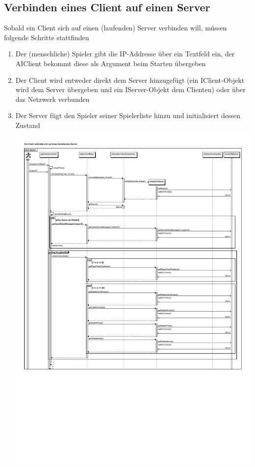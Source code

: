 \documentclass[a4paper,10pt]{article}
\begin{document}
\subsection{Verbinden eines Client auf einen Server}
Sobald ein Client sich auf einen (laufenden) Server verbinden will, müssen folgende Schritte stattfinden
\begin{enumerate}
\item Der (menschliche) Spieler gibt die IP-Addresse über ein Textfeld ein, der AIClient bekommt diese als Argument beim Starten übergeben
\item Der Client wird entweder direkt dem Server hinzugefügt (ein IClient-Objekt wird dem Server übergeben und ein IServer-Objekt dem Clienten) oder über das Netzwerk verbunden
\item Der Server fügt den Spieler seiner Spielerliste hinzu und initialisiert dessen Zustand
\includegraphics{client_verbinden} 
\end{enumerate}
\end{document}
